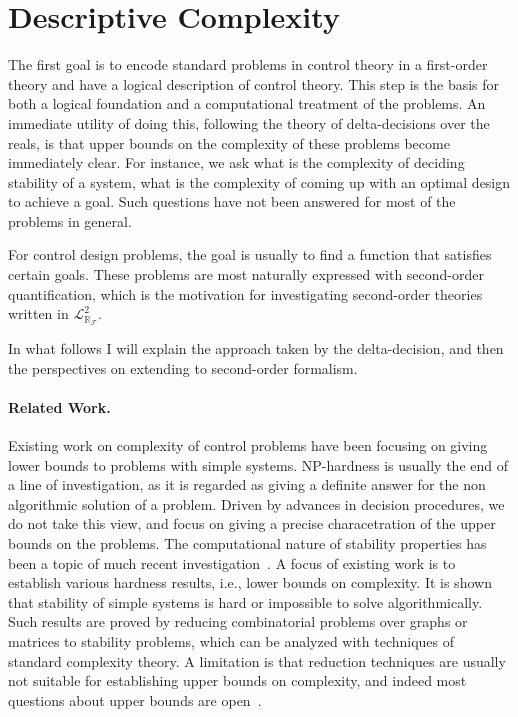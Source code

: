 \documentclass[10pt]{article}
\newcommand{\lrf}{\mathcal{L}_{\mathbb{R}_{\mathcal{F}}}}
\theoremstyle{definition}
\begin{document}
\newpage
\section{Descriptive Complexity}

The first goal is to encode standard problems in control theory in a first-order theory and have a logical description of control theory. This step is the basis for both a logical foundation and a computational treatment of the problems. An immediate utility of doing this, following the theory of delta-decisions over the reals, is that upper bounds on the complexity of these problems become immediately clear. For instance, we ask what is the complexity of deciding stability of a system, what is the complexity of coming up with an optimal design to achieve a goal. Such questions have not been answered for most of the problems in general. 

For control design problems, the goal is usually to find a function that satisfies certain goals. These problems are most naturally expressed with second-order quantification, which is the motivation for investigating second-order theories written in $\lrf^2$. 

In what follows I will explain the approach taken by the delta-decision, and then the perspectives on extending to second-order formalism. 

\paragraph{Related Work.} Existing work on complexity of control problems have been focusing on giving lower bounds to problems with simple systems. NP-hardness is usually the end of a line of investigation, as it is regarded as giving a definite answer for the non algorithmic solution of a problem. Driven by advances in decision procedures, we do not take this view, and focus on giving a precise characetration of the upper bounds on the problems. The computational nature of stability properties has been a topic of much recent investigation~\cite{DBLP:journals/corr/AhmadiP13,DBLP:journals/automatica/BlondelT99,DBLP:journals/automatica/BlondelT00,AAAthesis,DBLP:conf/hybrid/PrabhakarV13,DBLP:journals/corr/abs-1210-7420}. A focus of existing work is to establish various hardness results, i.e., lower bounds on complexity. It is shown that stability of simple systems is hard or impossible to solve algorithmically. Such results are proved by reducing combinatorial problems over graphs or matrices to stability problems, which can be analyzed with techniques of standard complexity theory. A limitation is that reduction techniques are usually not suitable for establishing upper bounds on complexity, and indeed most questions about upper bounds are open~\cite{AAAthesis}. 
\end{document}
